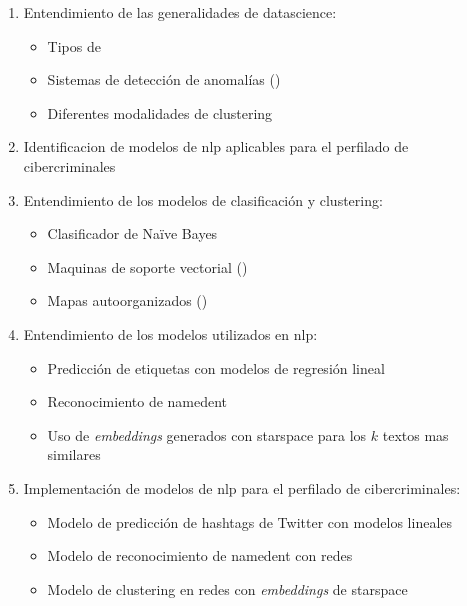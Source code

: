 \begin{enumerate}
\item Entendimiento de las generalidades de \gls{datascience}:
  \begin{itemize}
  \item Tipos de 
  \item Sistemas de detección de anomalías ()
  \item Diferentes modalidades de \gls{clustering}
  \end{itemize}
\item Identificacion de modelos de \gls{nlp} aplicables para el perfilado de cibercriminales
\item Entendimiento de los modelos de clasificación y \gls{clustering}:
  \begin{itemize}
  \item Clasificador de Na\"ive Bayes
  \item Maquinas de soporte vectorial ()
  \item Mapas autoorganizados ()
  \end{itemize}
\item Entendimiento de los modelos utilizados en \gls{nlp}:
  \begin{itemize}
  \item Predicción de etiquetas con modelos de regresión lineal
  \item Reconocimiento de \gls{namedent}
  \item Uso de \emph{embeddings} generados con \gls{starspace} para los $k$ textos mas similares
  \end{itemize}
\item Implementación de modelos de \gls{nlp} para el perfilado de cibercriminales:
  \begin{itemize}
  \item Modelo de predicción de hashtags de Twitter con modelos lineales 
  \item Modelo de reconocimiento de \gls{namedent} con redes  
  \item Modelo de \gls{clustering} en redes  con \emph{embeddings} de \gls{starspace} 
  \end{itemize}
\end{enumerate}

